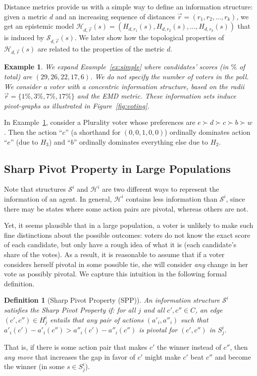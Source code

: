 \documentclass[letterpaper]{article} %
\def\calS{\mathcal{S}}
\def\calH{\mathcal{H}}
\newtheorem{example}[theorem]{Example}
\newtheorem{definition}{Definition}
\begin{document}
Distance metrics provide us with a simple way to define an information structure: given a metric $d$ and an increasing sequence of distances $\vec r = (r_1,r_2,\ldots,r_k)$, we get an epistemic model $\calH_{d,\vec r}(s) = (H_{d,r_1}(s),H_{d,r_2}(s),\ldots,H_{d,r_k}(s))$ that is induced by $\calS_{d,\vec r}(s)$. We later show how the topological properties of $\calH_{d,\vec r}(s)$ are related to the properties of the metric $d$.

\begin{example}\label{ex:voting} We expand Example~\ref{ex:simple} where candidates' scores (in $\%$ of total) are $(29,26,22,17,6)$. We do not specify the number of voters in the poll. We consider a voter with a concentric information structure, based on the radii $\vec r= \{1\%,3\%,7\%,17\%\}$ and the EMD metric. These information sets induce pivot-graphs as illustrated in Figure~\ref{fig:voting}.
\end{example}

In Example~\ref{ex:voting}, consider a Plurality voter whose preferences are $e\succ d\succ c\succ b\succ w$. Then the action ``$c$'' (a shorthand for $(0,0,1,0,0)$) ordinally dominates action ``$e$'' (due to $H_3$) and ``$b$'' ordinally dominates everything else due to $H_2$.


\subsection{Sharp Pivot Property in Large Populations}
Note that structures $\calS^i$ and $\calH^i$ are two different ways to represent the information of an agent. In general, $\calH^i$ contains less information than $\calS^i$, since there may be states where some action pairs are pivotal, whereas others are not.

Yet, it seems plausible that in a large population, a voter is unlikely to make such fine distinctions about the possible outcomes: voters do not know the exact score of each candidate, but only have a rough idea of what it is (each candidate's share of the votes). As a result, it is reasonable to assume that if a voter considers herself pivotal in some possible tie, she will consider \emph{any} change in her vote as possibly pivotal. We capture this intuition in the following formal definition.


\begin{definition}[Sharp Pivot Property (SPP)]\label{def:pivot}
An information structure $\calS^i$ satisfies the \emph{Sharp Pivot Property} if:
for all $j $ and all $c',c''\in C$, an edge $(c',c'')\in H^i_j$ entails that any pair of actions $(a'_i,a''_i)$ such that $a'_i(c')-a'_i(c'') > a''_i(c')-a''_i(c'')$ is pivotal for $(c',c'')$ in $S^i_j$.
\end{definition}
That is, if there is some action pair that makes $c'$ the winner instead of $c''$, then \emph{any move} that increases the gap in favor of $c'$ might make $c'$ beat $c''$ and become the winner (in some $s\in S^i_j$).
\end{document}
